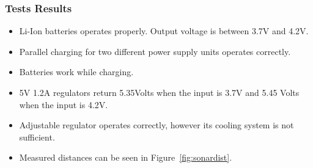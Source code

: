   \subsubsection{Tests Results} 
\begin{itemize}
\item Li-Ion batteries operates properly. Output voltage is between 3.7V and 4.2V.
\item Parallel charging for two different power supply units operates correctly.
\item Batteries work while charging.
\item 5V 1.2A regulators return 5.35Volts when the  input is 3.7V  and 5.45 Volts when the input is 4.2V.
\item Adjustable regulator operates correctly, however its cooling system is not sufficient.
\item Measured distances can be seen in Figure~\ref{fig:sonardist}.



\end{itemize}
